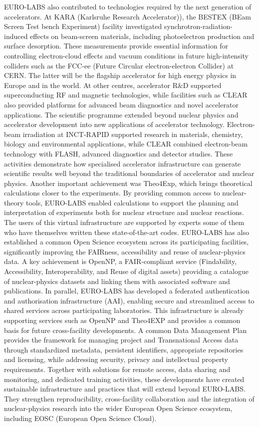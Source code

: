 \begin{itemize}
EURO-LABS also contributed to technologies required by the next generation of accelerators. At KARA (Karlsruhe Research Accelerator)), the BESTEX (BEam Screen Test bench Experiment) facility investigated synchrotron-radiation-induced effects on beam-screen materials, including photoelectron production and surface desorption. These measurements provide essential information for controlling electron-cloud effects and vacuum conditions in future high-intensity colliders such as the FCC-ee (Future  Circular electron-electron Collider) at CERN. The latter will be the flagship accelerator for high energy physics  in Europe and in the world. At other centres, accelerator R&D supported superconducting RF and magnetic technologies, while facilities such as CLEAR also provided platforms for advanced beam diagnostics and novel accelerator applications.
The scientific programme extended beyond nuclear physics and accelerator development into new applications of accelerator technology. Electron-beam irradiation at INCT-RAPID supported research in materials, chemistry, biology and environmental applications, while CLEAR combined electron-beam technology with FLASH, advanced diagnostics and detector studies. These activities demonstrate how specialised accelerator infrastructure can generate scientific results well beyond the traditional boundaries of accelerator and nuclear physics.
Another important achievement was Theo4Exp, which brings theoretical calculations closer to the experiments. By providing common access to nuclear-theory tools, EURO-LABS enabled calculations to support the planning and interpretation of experiments both for nuclear structure and nuclear reactions. The users of this virtual infrastructure are supported by experts some of them who have themselves written these state-of-the-art codes.  EURO-LABS has also established a common Open Science ecosystem across its participating facilities, significantly improving the FAIRness, accessibility and reuse of nuclear-physics data. A key achievement is OpenNP, a FAIR-compliant service (Findability, Accessibility, Interoperability, and Reuse of digital assets) providing a catalogue of nuclear-physics datasets and linking them with associated software and publications. In parallel, EURO-LABS has developed a federated authentication and authorisation infrastructure (AAI), enabling secure and streamlined access to shared services across participating laboratories. This infrastructure is already supporting services such as OpenNP and Theo4EXP and provides a common basis for future cross-facility developments. A common Data Management Plan provides the framework for managing project and Transnational Access data through standardized metadata, persistent identifiers, appropriate repositories and licensing, while addressing security, privacy and intellectual property requirements. Together with solutions for remote access, data sharing and monitoring, and dedicated training activities, these developments have created sustainable infrastructure and practices that will extend beyond EURO-LABS. They strengthen reproducibility, cross-facility collaboration and the integration of nuclear-physics research into the wider European Open Science ecosystem, including EOSC (European Open Science Cloud).

\end{itemize}

